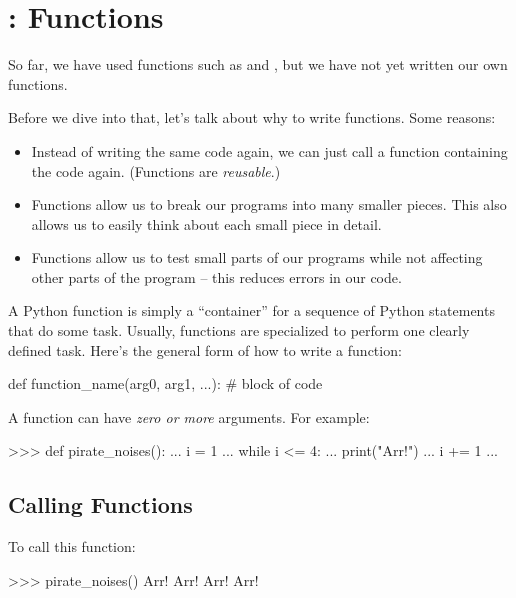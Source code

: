 \documentclass[11pt]{cselabheader}
\begin{document}
\pagebreak
\section{\protect{}: Functions}
\label{sec:funcs}

So far, we have used functions such as  and
, but we have not yet written our own functions.

Before we dive into that, let's talk about why to write functions. Some reasons:
\begin{itemize}
  \item Instead of writing the same code again, we can just call a function
    containing the code again. (Functions are \emph{reusable}.)
  \item Functions allow us to break our programs into many smaller pieces. This
    also allows us to easily think about each small piece in detail.
  \item Functions allow us to test small parts of our programs while not
    affecting other parts of the program -- this reduces errors in our code.
\end{itemize}

A Python function is simply a ``container'' for a sequence of Python statements
that do some task.
Usually, functions are specialized to perform one clearly defined task.
Here's the general form of how to write a function:

\begin{python3code}
def function_name(arg0, arg1, ...):
    # block of code
\end{python3code}

A function can have \emph{zero or more} arguments. For example:

\begin{pyconcode}
>>> def pirate_noises():
...     i = 1
...     while i <= 4:
...         print("Arr!")
...         i += 1
...
\end{pyconcode}

\subsection{Calling Functions}

To call this function:

\begin{pyconcode}
>>> pirate_noises()
Arr!
Arr!
Arr!
Arr!
\end{pyconcode}
\end{document}
